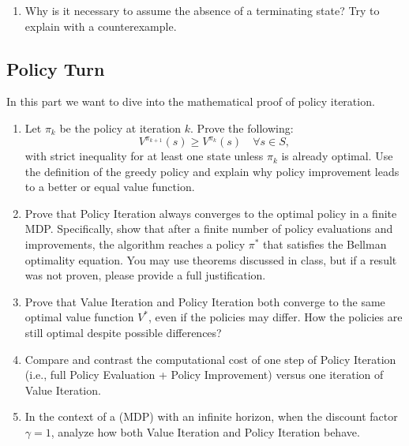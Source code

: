 \documentclass[12pt]{article}
\begin{document}
{{\begin{enumerate}[resume*]
   

    \item  
    Why is it necessary to assume the absence of a terminating state? Try to explain with a counterexample.  
\end{enumerate}



\subsection{Policy Turn}
In this part we want to dive into the mathematical proof of policy iteration.
\begin{enumerate}[resume*]
\item Let \( \pi_k \) be the policy at iteration \( k \). Prove the following:
    \[
    V^{\pi_{k+1}}(s) \geq V^{\pi_k}(s) \quad \forall s \in S,
    \]
    with strict inequality for at least one state unless \( \pi_k \) is already optimal. Use the definition of the greedy policy and explain why policy improvement leads to a better or equal value function.

    \item Prove that Policy Iteration always converges to the optimal policy in a finite MDP. Specifically, show that after a finite number of policy evaluations and improvements, the algorithm reaches a policy \( \pi^* \) that satisfies the Bellman optimality equation.  
    You may use theorems discussed in class, but if a result was not proven, please provide a full justification.
    
\item Prove that Value Iteration and Policy Iteration both converge to the same optimal value function \( V^* \), even if the policies may differ. How the policies are still optimal despite possible differences?

    \item Compare and contrast the computational cost of one step of Policy Iteration (i.e., full Policy Evaluation + Policy Improvement) versus one iteration of Value Iteration.  

    \item In the context of a (MDP) with an infinite horizon, when the discount factor \( \gamma = 1 \), analyze how both Value Iteration and Policy Iteration behave.


\end{enumerate}}}
\end{document}
